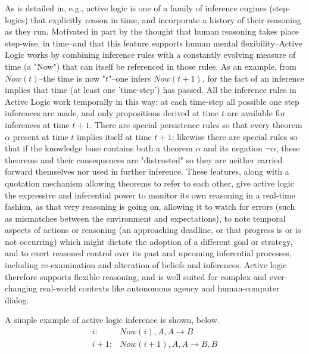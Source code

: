 \documentclass[]{llncs}
\begin{document}
As is detailed in, e.g.,
\cite{Elgot-etalTR,elgot-drapkin/perlis:reasoning:jetai,Purang-prac99}
active logic is one of a family of inference engines (step-logics)
that explicitly reason in time, and incorporate a history of their
reasoning as they run.  Motivated in part by the thought that human
reasoning takes place step-wise, in time--and that this feature
supports human mental flexibility--Active Logic works by combining
inference rules with a constantly evolving measure of time (a "Now")
that can itself be referenced in those rules. As an example, from
$\mathit{Now}(t)$--the time is now "$t$"--one infers $\mathit{Now}(t+1)$, for the fact of an
inference implies that time (at least one 'time-step') has passed.
All the inference rules in Active Logic work temporally in this way:
at each time-step all possible one step inferences are made, and only
propositions derived at time $t$ are available for inferences at time
$t+1$.  There are special persistence rules so that every theorem
$\alpha$ present at time $t$ implies itself at time $t+1$; likewise there
are special rules so that if the knowledge base contains both a
theorem $\alpha$ and its negation $\neg \alpha$, these theorems and
their consequences are "distrusted" so they are neither carried
forward themselves nor used in further inference.  These features,
along with a quotation mechanism allowing theorems to refer to each
other, give active logic the expressive and inferential power to
monitor its own reasoning in a real-time fashion, as that very
reasoning is going on, allowing it to watch for errors (such as
mismatches between the environment and expectations), to note temporal
aspects of actions or reasoning (an approaching deadline, or that
progress is or is not occurring) which might dictate the adoption of a
different goal or strategy, and to exert reasoned control over its
past and upcoming inferential processes, including re-examination and
alteration of beliefs and inferences.  Active logic therefore supports
flexible reasoning, and is well suited for complex and ever-changing
real-world contexts like autonomous agency and human-computer dialog.

A simple example of active logic inference is shown, below.
\begin{align*}
i:   & \mathit{Now}(i),   A, A \rightarrow B \\
i+1: & \mathit{Now}(i+1), A, A \rightarrow B, B
\end{align*}
 
 
\end{document}
